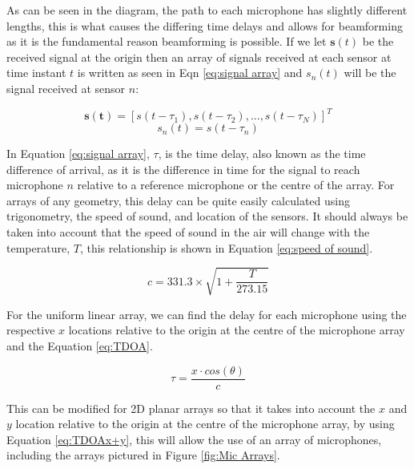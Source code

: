 \documentclass{UoNMCHA}
\numberwithin{equation}{section}
\begin{document}
    As can be seen in the diagram, the path to each microphone has slightly different lengths, this is what causes the differing time delays and allows for beamforming as it is the fundamental reason beamforming is possible. If we let $\mathbf{s}(t)$ be the received signal at the origin then an array of signals received at each sensor at time instant $t$ is written as seen in Eqn \ref{eq:signal array} and $s_n(t)$ will be the signal received at sensor $n$:
    
    \begin{equation}
        \mathbf{s{(t)}} = [s(t-\tau_1), s(t-\tau_2), ..., s(t-\tau_N)]^T
        \label{eq:signal array}
    \end{equation}
    \begin{equation}
        s_n(t) = s(t-\tau_n)
        \label{eq:sensor signal}
    \end{equation}
    
    In Equation \ref{eq:signal array}, $\tau$, is the time delay, also known as the time difference of arrival, as it is the difference in time for the signal to reach microphone $n$ relative to a reference microphone or the centre of the array. For arrays of any geometry, this delay can be quite easily calculated using trigonometry, the speed of sound, and location of the sensors. It should always be taken into account that the speed of sound in the air will change with the temperature, $T$, this relationship is shown in Equation \ref{eq:speed of sound}. 
    
    \begin{equation}
        c = 331.3 \times \sqrt{1+\frac{T}{273.15}}
        \label{eq:speed of sound}
    \end{equation}
    
    For the uniform linear array, we can find the delay for each microphone using the respective $x$ locations relative to the origin at the centre of the microphone array and the Equation \ref{eq:TDOA}.
    
    \begin{equation}
        \tau = \frac{x\cdot cos(\theta)}{c}
        \label{eq:TDOA}
    \end{equation}
    
    This can be modified for 2D planar arrays so that it takes into account the $x$ and $y$ location  relative to the origin at the centre of the microphone array, by using Equation \ref{eq:TDOAx+y}, this will allow the use of an array of microphones, including the arrays pictured in Figure \ref{fig:Mic Arrays}.
    
\end{document}
